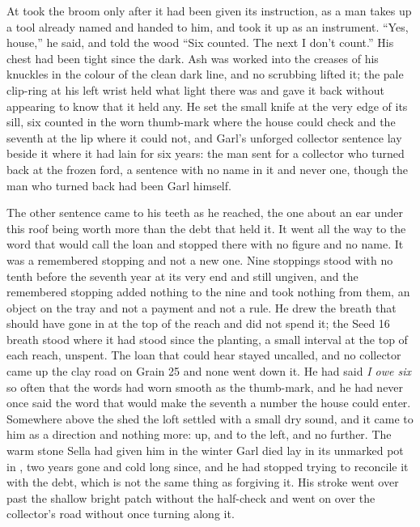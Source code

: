 \scenebreak

At   took the broom only after it had been given its instruction, as a man takes up a tool already named and handed to him, and took it up as an instrument. “Yes, house,” he said, and told the wood “Six counted. The next I don't count.” His chest had been tight since the dark. Ash was worked into the creases of his knuckles in the colour of the clean dark line, and no scrubbing lifted it; the pale clip-ring at his left wrist held what light there was and gave it back without appearing to know that it held any. He set the small knife at the very edge of its sill, six counted in the worn thumb-mark where the house could check and the seventh at the lip where it could not, and Garl's unforged collector sentence lay beside it where it had lain for six years: the man sent for a collector who turned back at the frozen ford, a sentence with no name in it and never one, though the man who turned back had been Garl himself.

The other sentence came to his teeth as he reached, the one about an ear under this roof being worth more than the debt that held it. It went all the way to the word that would call the loan and stopped there with no figure and no name. It was a remembered stopping and not a new one. Nine stoppings stood with no tenth before the seventh year at its very end and still ungiven, and the remembered stopping added nothing to the nine and took nothing from them, an object on the tray and not a payment and not a rule. He drew the breath that should have gone in at the top of the reach and did not spend it; the Seed 16 breath stood where it had stood since the planting, a small interval at the top of each reach, unspent. The loan that could hear stayed uncalled, and no collector came up the clay road on Grain 25 and none went down it. He had said \emph{I owe six} so often that the words had worn smooth as the thumb-mark, and he had never once said the word that would make the seventh a number the house could enter. Somewhere above the shed the loft settled with a small dry sound, and it came to him as a direction and nothing more: up, and to the left, and no further. The warm stone Sella had given him in the winter Garl died lay in its unmarked pot in , two years gone and cold long since, and he had stopped trying to reconcile it with the debt, which is not the same thing as forgiving it. His stroke went over  past the shallow bright patch without the half-check and went on over the collector's road without once turning along it.

